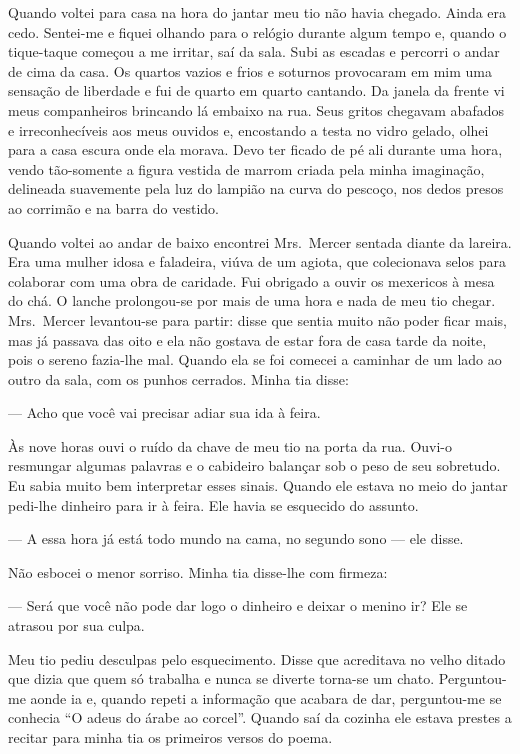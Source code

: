 Quando voltei para casa na hora do jantar meu tio não havia chegado.  Ainda era
cedo.  Sentei-me e fiquei olhando para o relógio durante algum tempo e, quando
o tique-taque começou a me irritar, saí da sala.  Subi as escadas e percorri o
andar de cima da casa.  Os quartos vazios e frios e soturnos provocaram em mim
uma sensação de liberdade e fui de quarto em quarto cantando.  Da janela da
frente vi meus companheiros brincando lá embaixo na rua.  Seus gritos chegavam
abafados e irreconhecíveis aos meus ouvidos e, encostando a testa no vidro
gelado, olhei para a casa escura onde ela morava.  Devo ter ficado de pé ali
durante uma hora, vendo tão-somente a figura vestida de marrom criada pela
minha imaginação, delineada suavemente pela luz do lampião na curva do pescoço,
nos dedos presos ao corrimão e na barra do vestido.

Quando voltei ao andar de baixo encontrei Mrs.~Mercer sentada diante da
lareira.  Era uma mulher idosa e faladeira, viúva de um agiota, que colecionava
selos para colaborar com uma obra de caridade.  Fui obrigado a ouvir os
mexericos à mesa do chá.  O lanche prolongou-se por mais de uma hora e nada de
meu tio chegar.  Mrs.~Mercer levantou-se para partir: disse que sentia muito
não poder ficar mais, mas já passava das oito e ela não gostava de estar fora
de casa tarde da noite, pois o sereno fazia-lhe mal.  Quando ela se foi comecei
a caminhar de um lado ao outro da sala, com os punhos cerrados.  Minha tia
disse:

--- Acho que você vai precisar adiar sua ida à feira.

Às nove horas ouvi o ruído da chave de meu tio na porta da rua.  Ouvi-o
resmungar algumas palavras e o cabideiro balançar sob o peso de seu sobretudo.
Eu sabia muito bem interpretar esses sinais.  Quando ele estava no meio do
jantar pedi-lhe dinheiro para ir à feira.  Ele havia se esquecido do assunto.

--- A essa hora já está todo mundo na cama, no segundo sono --- ele disse.

Não esbocei o menor sorriso.  Minha tia disse-lhe com firmeza:

--- Será que você não pode dar logo o dinheiro e deixar o menino ir?  Ele se
atrasou por sua culpa.

Meu tio pediu desculpas pelo esquecimento.  Disse que acreditava no velho
ditado que dizia que quem só trabalha e nunca se diverte torna-se um chato.
Perguntou-me aonde ia e, quando repeti a informação que acabara de dar,
perguntou-me se conhecia “O adeus do árabe ao corcel”.  Quando saí da cozinha
ele estava prestes a recitar para minha tia os primeiros versos do poema.

